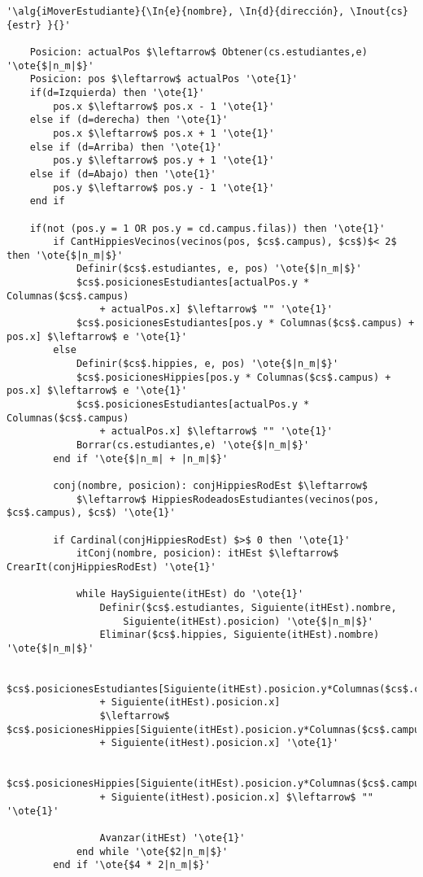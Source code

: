 \begin{lstlisting}[mathescape]
'\alg{iMoverEstudiante}{\In{e}{nombre}, \In{d}{dirección}, \Inout{cs}{estr} }{}'

	Posicion: actualPos $\leftarrow$ Obtener(cs.estudiantes,e) '\ote{$|n_m|$}'
	Posicion: pos $\leftarrow$ actualPos '\ote{1}'
	if(d=Izquierda) then '\ote{1}'
		pos.x $\leftarrow$ pos.x - 1 '\ote{1}'
	else if (d=derecha) then '\ote{1}'
		pos.x $\leftarrow$ pos.x + 1 '\ote{1}'
	else if (d=Arriba) then '\ote{1}'
		pos.y $\leftarrow$ pos.y + 1 '\ote{1}'
 	else if (d=Abajo) then '\ote{1}'
 		pos.y $\leftarrow$ pos.y - 1 '\ote{1}'
 	end if

 	if(not (pos.y = 1 OR pos.y = cd.campus.filas)) then '\ote{1}'
		if CantHippiesVecinos(vecinos(pos, $cs$.campus), $cs$)$< 2$  then '\ote{$|n_m|$}'
			Definir($cs$.estudiantes, e, pos) '\ote{$|n_m|$}'
			$cs$.posicionesEstudiantes[actualPos.y * Columnas($cs$.campus)
				+ actualPos.x] $\leftarrow$ "" '\ote{1}'
			$cs$.posicionesEstudiantes[pos.y * Columnas($cs$.campus) + pos.x] $\leftarrow$ e '\ote{1}'
		else
			Definir($cs$.hippies, e, pos) '\ote{$|n_m|$}'
			$cs$.posicionesHippies[pos.y * Columnas($cs$.campus) + pos.x] $\leftarrow$ e '\ote{1}'
			$cs$.posicionesEstudiantes[actualPos.y * Columnas($cs$.campus)
				+ actualPos.x] $\leftarrow$ "" '\ote{1}'
			Borrar(cs.estudiantes,e) '\ote{$|n_m|$}'
		end if '\ote{$|n_m| + |n_m|$}'

		conj(nombre, posicion): conjHippiesRodEst $\leftarrow$
			$\leftarrow$ HippiesRodeadosEstudiantes(vecinos(pos, $cs$.campus), $cs$) '\ote{1}'

		if Cardinal(conjHippiesRodEst) $>$ 0 then '\ote{1}'
			itConj(nombre, posicion): itHEst $\leftarrow$ CrearIt(conjHippiesRodEst) '\ote{1}'

			while HaySiguiente(itHEst) do '\ote{1}'
				Definir($cs$.estudiantes, Siguiente(itHEst).nombre,
					Siguiente(itHEst).posicion) '\ote{$|n_m|$}'
				Eliminar($cs$.hippies, Siguiente(itHEst).nombre) '\ote{$|n_m|$}'

				$cs$.posicionesEstudiantes[Siguiente(itHEst).posicion.y*Columnas($cs$.campus)
				+ Siguiente(itHEst).posicion.x]
				$\leftarrow$ $cs$.posicionesHippies[Siguiente(itHEst).posicion.y*Columnas($cs$.campus)
				+ Siguiente(itHest).posicion.x] '\ote{1}'

				$cs$.posicionesHippies[Siguiente(itHEst).posicion.y*Columnas($cs$.campus)
				+ Siguiente(itHest).posicion.x] $\leftarrow$ "" '\ote{1}'

				Avanzar(itHEst) '\ote{1}'
			end while '\ote{$2|n_m|$}'
		end if '\ote{$4 * 2|n_m|$}'


\end{lstlisting}
